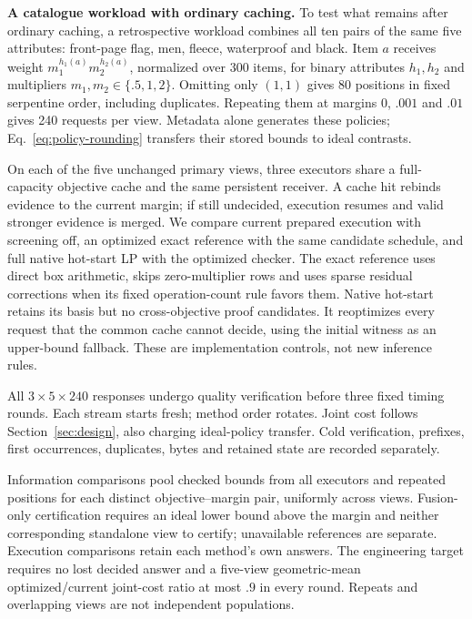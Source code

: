 \textbf{A catalogue workload with ordinary caching.}
To test what remains after ordinary caching, a retrospective workload combines all ten pairs of the same five attributes: front-page flag, men, fleece, waterproof and black. Item $a$ receives weight $m_1^{h_1(a)}m_2^{h_2(a)}$, normalized over 300 items, for binary attributes $h_1,h_2$ and multipliers $m_1,m_2\in\{.5,1,2\}$. Omitting only $(1,1)$ gives 80 positions in fixed serpentine order, including duplicates. Repeating them at margins $0$, $.001$ and $.01$ gives 240 requests per view. Metadata alone generates these policies; Eq.~\eqref{eq:policy-rounding} transfers their stored bounds to ideal contrasts.

On each of the five unchanged primary views, three executors share a full-capacity objective cache and the same persistent receiver. A cache hit rebinds evidence to the current margin; if still undecided, execution resumes and valid stronger evidence is merged. We compare current prepared execution with screening off, an optimized exact reference with the same candidate schedule, and full native hot-start LP with the optimized checker. The exact reference uses direct box arithmetic, skips zero-multiplier rows and uses sparse residual corrections when its fixed operation-count rule favors them. Native hot-start retains its basis but no cross-objective proof candidates. It reoptimizes every request that the common cache cannot decide, using the initial witness as an upper-bound fallback. These are implementation controls, not new inference rules.

All $3\times5\times240$ responses undergo quality verification before three fixed timing rounds. Each stream starts fresh; method order rotates. Joint cost follows Section~\ref{sec:design}, also charging ideal-policy transfer. Cold verification, prefixes, first occurrences, duplicates, bytes and retained state are recorded separately.

Information comparisons pool checked bounds from all executors and repeated positions for each distinct objective--margin pair, uniformly across views. Fusion-only certification requires an ideal lower bound above the margin and neither corresponding standalone view to certify; unavailable references are separate. Execution comparisons retain each method's own answers. The engineering target requires no lost decided answer and a five-view geometric-mean optimized/current joint-cost ratio at most $.9$ in every round. Repeats and overlapping views are not independent populations.
